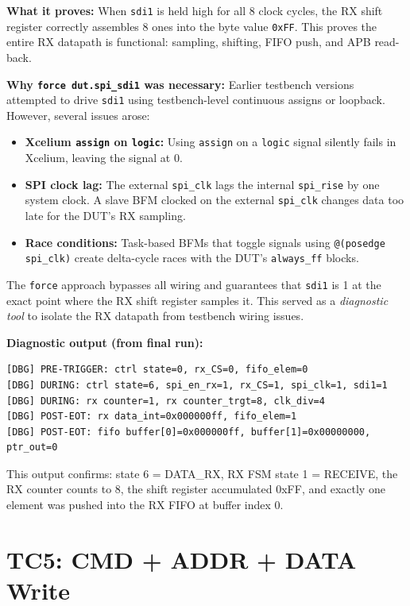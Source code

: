\textbf{What it proves:} When \texttt{sdi1} is held high for all 8 clock cycles, the RX shift
register correctly assembles 8 ones into the byte value \texttt{0xFF}. This proves the entire
RX datapath is functional: sampling, shifting, FIFO push, and APB read-back.

\textbf{Why \texttt{force dut.spi\_sdi1} was necessary:}
Earlier testbench versions attempted to drive \texttt{sdi1} using testbench-level continuous
assigns or loopback. However, several issues arose:
\begin{itemize}[leftmargin=2em]
  \item \textbf{Xcelium \texttt{assign} on \texttt{logic}:} Using \texttt{assign} on a
        \texttt{logic} signal silently fails in Xcelium, leaving the signal at 0.
  \item \textbf{SPI clock lag:} The external \texttt{spi\_clk} lags the internal \texttt{spi\_rise}
        by one system clock. A slave BFM clocked on the external \texttt{spi\_clk} changes data
        too late for the DUT's RX sampling.
  \item \textbf{Race conditions:} Task-based BFMs that toggle signals using \texttt{@(posedge spi\_clk)}
        create delta-cycle races with the DUT's \texttt{always\_ff} blocks.
\end{itemize}

The \texttt{force} approach bypasses all wiring and guarantees that \texttt{sdi1} is 1 at the
exact point where the RX shift register samples it. This served as a \emph{diagnostic tool} to
isolate the RX datapath from testbench wiring issues.

\textbf{Diagnostic output (from final run):}
\begin{verbatim}
[DBG] PRE-TRIGGER: ctrl state=0, rx_CS=0, fifo_elem=0
[DBG] DURING: ctrl state=6, spi_en_rx=1, rx_CS=1, spi_clk=1, sdi1=1
[DBG] DURING: rx counter=1, rx counter_trgt=8, clk_div=4
[DBG] POST-EOT: rx data_int=0x000000ff, fifo_elem=1
[DBG] POST-EOT: fifo buffer[0]=0x000000ff, buffer[1]=0x00000000, ptr_out=0
\end{verbatim}

This output confirms: state 6 = DATA\_RX, RX FSM state 1 = RECEIVE, the RX counter counts to 8,
the shift register accumulated 0xFF, and exactly one element was pushed into the RX FIFO at
buffer index 0.

\section{TC5: CMD + ADDR + DATA Write}

